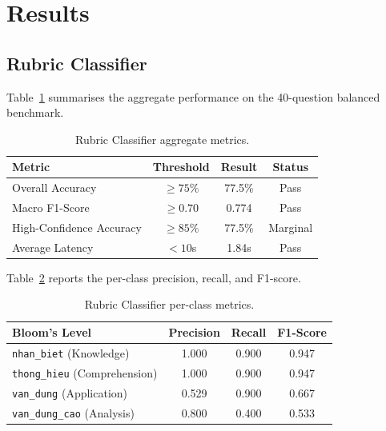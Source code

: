 \documentclass[12pt, a4paper]{article}
\begin{document}
\section{Results}
\label{sec:results}

\subsection{Rubric Classifier}

Table~\ref{tab:rubric-agg} summarises the aggregate performance on the 40-question balanced benchmark.

\begin{table}[H]
\centering
\caption{Rubric Classifier aggregate metrics.}
\label{tab:rubric-agg}
\begin{tabular}{l c c c}
\toprule
\textbf{Metric} & \textbf{Threshold} & \textbf{Result} & \textbf{Status} \\
\midrule
Overall Accuracy           & $\geq 75\%$  & 77.5\%  & Pass \\
Macro F1-Score             & $\geq 0.70$  & 0.774   & Pass \\
High-Confidence Accuracy   & $\geq 85\%$  & 77.5\%  & Marginal \\
Average Latency            & $< 10$s      & 1.84s   & Pass \\
\bottomrule
\end{tabular}
\end{table}

Table~\ref{tab:rubric-class} reports the per-class precision, recall, and F1-score.

\begin{table}[H]
\centering
\caption{Rubric Classifier per-class metrics.}
\label{tab:rubric-class}
\begin{tabular}{l c c c}
\toprule
\textbf{Bloom's Level} & \textbf{Precision} & \textbf{Recall} & \textbf{F1-Score} \\
\midrule
\texttt{nhan\_biet} (Knowledge)       & 1.000 & 0.900 & 0.947 \\
\texttt{thong\_hieu} (Comprehension)  & 1.000 & 0.900 & 0.947 \\
\texttt{van\_dung} (Application)      & 0.529 & 0.900 & 0.667 \\
\texttt{van\_dung\_cao} (Analysis)    & 0.800 & 0.400 & 0.533 \\
\bottomrule
\end{tabular}
\end{table}
\end{document}
